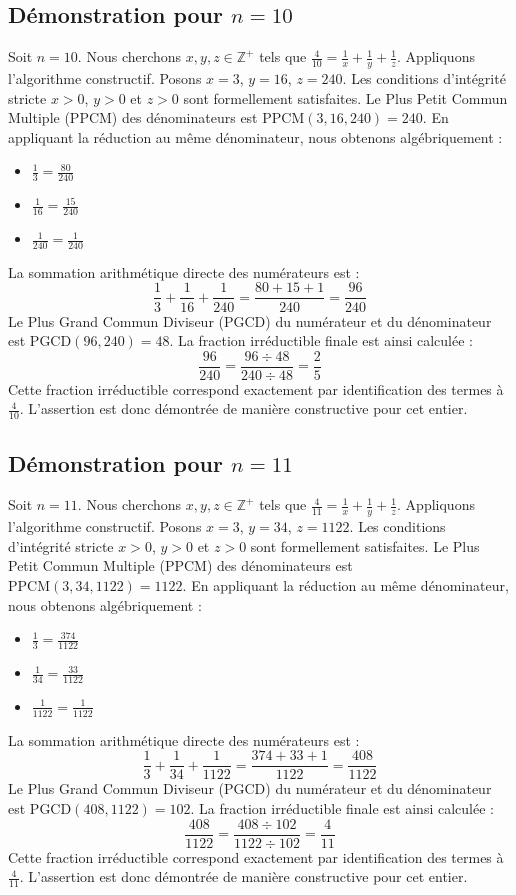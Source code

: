 \documentclass[11pt,a4paper]{article}
\begin{document}
\subsection{Démonstration pour $n = 10$}
Soit $n = 10$. Nous cherchons $x, y, z \in \mathbb{Z}^{+}$ tels que $\frac{4}{10} = \frac{1}{x} + \frac{1}{y} + \frac{1}{z}$.
Appliquons l'algorithme constructif. Posons $x = 3$, $y = 16$, $z = 240$.
Les conditions d'intégrité stricte $x > 0$, $y > 0$ et $z > 0$ sont formellement satisfaites.
Le Plus Petit Commun Multiple (PPCM) des dénominateurs est $\text{PPCM}(3, 16, 240) = 240$.
En appliquant la réduction au même dénominateur, nous obtenons algébriquement :
\begin{itemize}
    \item $\frac{1}{3} = \frac{80}{240}$
    \item $\frac{1}{16} = \frac{15}{240}$
    \item $\frac{1}{240} = \frac{1}{240}$
\end{itemize}
La sommation arithmétique directe des numérateurs est :
$$ \frac{1}{3} + \frac{1}{16} + \frac{1}{240} = \frac{80 + 15 + 1}{240} = \frac{96}{240} $$
Le Plus Grand Commun Diviseur (PGCD) du numérateur et du dénominateur est $\text{PGCD}(96, 240) = 48$.
La fraction irréductible finale est ainsi calculée :
$$ \frac{96}{240} = \frac{96 \div 48}{240 \div 48} = \frac{2}{5} $$
Cette fraction irréductible correspond exactement par identification des termes à $\frac{4}{10}$. L'assertion est donc démontrée de manière constructive pour cet entier.

\subsection{Démonstration pour $n = 11$}
Soit $n = 11$. Nous cherchons $x, y, z \in \mathbb{Z}^{+}$ tels que $\frac{4}{11} = \frac{1}{x} + \frac{1}{y} + \frac{1}{z}$.
Appliquons l'algorithme constructif. Posons $x = 3$, $y = 34$, $z = 1122$.
Les conditions d'intégrité stricte $x > 0$, $y > 0$ et $z > 0$ sont formellement satisfaites.
Le Plus Petit Commun Multiple (PPCM) des dénominateurs est $\text{PPCM}(3, 34, 1122) = 1122$.
En appliquant la réduction au même dénominateur, nous obtenons algébriquement :
\begin{itemize}
    \item $\frac{1}{3} = \frac{374}{1122}$
    \item $\frac{1}{34} = \frac{33}{1122}$
    \item $\frac{1}{1122} = \frac{1}{1122}$
\end{itemize}
La sommation arithmétique directe des numérateurs est :
$$ \frac{1}{3} + \frac{1}{34} + \frac{1}{1122} = \frac{374 + 33 + 1}{1122} = \frac{408}{1122} $$
Le Plus Grand Commun Diviseur (PGCD) du numérateur et du dénominateur est $\text{PGCD}(408, 1122) = 102$.
La fraction irréductible finale est ainsi calculée :
$$ \frac{408}{1122} = \frac{408 \div 102}{1122 \div 102} = \frac{4}{11} $$
Cette fraction irréductible correspond exactement par identification des termes à $\frac{4}{11}$. L'assertion est donc démontrée de manière constructive pour cet entier.
\end{document}
